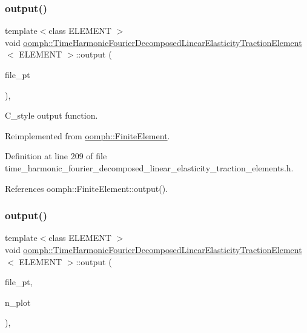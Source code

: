 \subsubsection{\texorpdfstring{output()}{output()}\hspace{0.1cm}{\footnotesize\ttfamily [3/4]}}
{\footnotesize\ttfamily template$<$class E\+L\+E\+M\+E\+NT $>$ \\
void \hyperlink{classoomph_1_1TimeHarmonicFourierDecomposedLinearElasticityTractionElement}{oomph\+::\+Time\+Harmonic\+Fourier\+Decomposed\+Linear\+Elasticity\+Traction\+Element}$<$ E\+L\+E\+M\+E\+NT $>$\+::output (\begin{DoxyParamCaption}\item[{F\+I\+LE $\ast$}]{file\+\_\+pt }\end{DoxyParamCaption})\hspace{0.3cm}{\ttfamily [inline]}, {\ttfamily [virtual]}}



C\+\_\+style output function. 



Reimplemented from \hyperlink{classoomph_1_1FiniteElement_a72cddd09f8ddbee1a20a1ff404c6943e}{oomph\+::\+Finite\+Element}.



Definition at line 209 of file time\+\_\+harmonic\+\_\+fourier\+\_\+decomposed\+\_\+linear\+\_\+elasticity\+\_\+traction\+\_\+elements.\+h.



References oomph\+::\+Finite\+Element\+::output().

\mbox{\label{classoomph_1_1TimeHarmonicFourierDecomposedLinearElasticityTractionElement_a05047c59ac1f83f44f11f9f6b4e4ec3c}} 
\subsubsection{\texorpdfstring{output()}{output()}\hspace{0.1cm}{\footnotesize\ttfamily [4/4]}}
{\footnotesize\ttfamily template$<$class E\+L\+E\+M\+E\+NT $>$ \\
void \hyperlink{classoomph_1_1TimeHarmonicFourierDecomposedLinearElasticityTractionElement}{oomph\+::\+Time\+Harmonic\+Fourier\+Decomposed\+Linear\+Elasticity\+Traction\+Element}$<$ E\+L\+E\+M\+E\+NT $>$\+::output (\begin{DoxyParamCaption}\item[{F\+I\+LE $\ast$}]{file\+\_\+pt,  }\item[{const unsigned \&}]{n\+\_\+plot }\end{DoxyParamCaption})\hspace{0.3cm}{\ttfamily [inline]}, {\ttfamily [virtual]}}



